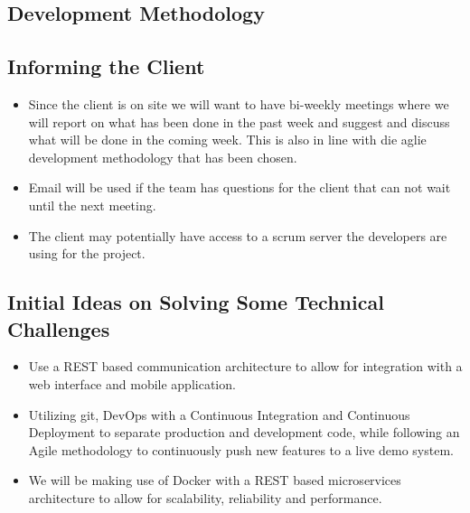 \subsection{Development Methodology}


\subsection{Informing the Client}
\begin{itemize}
	\item Since the client is on site we will want to have bi-weekly meetings where we will report on what has been done in the past week and suggest and discuss what will be done in the coming week. This is also in line with die aglie development methodology that has been chosen.
	\item Email will be used if the team has questions for the client that can not wait until the next meeting.
	\item The client may potentially have access to a scrum server the developers are using for the project.
\end{itemize}

\subsection{Initial Ideas on Solving Some Technical Challenges}
\begin{itemize}
	\item Use a REST based communication architecture to allow for integration with a web interface and mobile application.
	\item Utilizing git, DevOps with a Continuous Integration and Continuous Deployment to separate production and development code, while following an Agile methodology to continuously push new features to a live demo system.
	\item We will be making use of Docker with a REST based microservices architecture to allow for scalability, reliability and performance.
\end{itemize}

